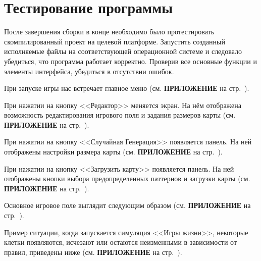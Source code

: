 \section{\label{sec:ch02/sec01/sub06}Тестирование программы}

После завершения сборки в конце необходимо было протестировать скомпилированный проект на целевой платформе. Запустить созданный исполняемые файлы на соответствующей операционной системе и следовало убедиться, что программа работает корректно. Проверив все основные функции и элементы интерфейса, убедиться в отсутствии ошибок. 

При запуске игры нас встречает главное меню (см. \textbf{\textsc{ПРИЛОЖЕНИЕ}} на стр.~\pageref{MainM}).

При нажатии на кнопку <<Редактор>> меняется экран. На нём отображена возможность редактирования игрового поля и задания размеров карты (см. \textbf{\textsc{ПРИЛОЖЕНИЕ}} на стр.~\pageref{Editor}). 

При нажатии на кнопку <<Случайная Генерация>> появляется панель. На ней отображены настройки размера карты (см. \textbf{\textsc{ПРИЛОЖЕНИЕ}} на стр.~\pageref{rand}). 

При нажатии на кнопку <<Загрузить карту>> появляется панель. На ней отображены кнопки выбора предопределенных паттернов и загрузки карты (см. \textbf{\textsc{ПРИЛОЖЕНИЕ}} на стр.~\pageref{downl}). 

Основное игровое поле выглядит следующим образом (см. \textbf{\textsc{ПРИЛОЖЕНИЕ}} на стр.~\pageref{map}).

Пример ситуации, когда запускается симуляция <<Игры жизни>>, некоторые клетки появляются, исчезают или остаются неизменными в зависимости от правил, приведены ниже (см. \textbf{\textsc{ПРИЛОЖЕНИЕ}} на стр.~\pageref{uim}).
